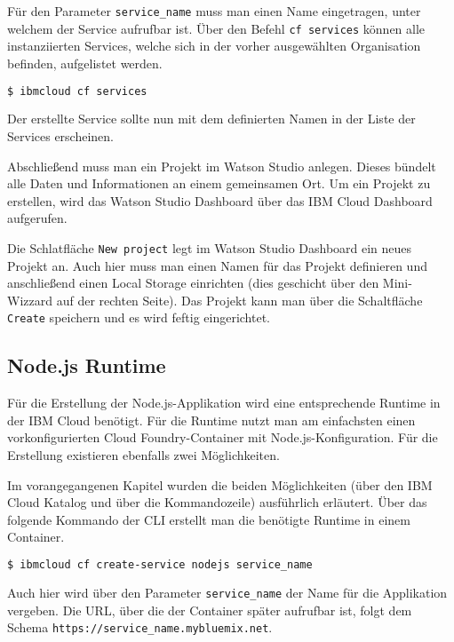 Für den Parameter \texttt{service\_name} muss man einen Name eingetragen, unter welchem der Service aufrufbar ist. Über
den Befehl \texttt{cf services} können alle instanziierten Services, welche sich in der vorher ausgewählten Organisation
befinden, aufgelistet werden.

\begin{lstlisting}[language=bash, caption=Auflisten aller Services in einer Organisation, label=Auflisten aller Services in einer Organisation]
    $ ibmcloud cf services
\end{lstlisting}

Der erstellte Service sollte nun mit dem definierten Namen in der Liste der Services erscheinen.

Abschließend muss man ein Projekt im Watson Studio anlegen. Dieses bündelt alle Daten und Informationen an einem
gemeinsamen Ort. Um ein Projekt zu erstellen, wird das Watson Studio Dashboard über das IBM Cloud Dashboard aufgerufen.

Die Schlatfläche \texttt{New project} legt im Watson Studio Dashboard ein neues Projekt an. Auch hier muss man einen Namen
für das Projekt definieren und anschließend einen Local Storage einrichten (dies geschicht über den Mini-Wizzard auf der
rechten Seite). Das Projekt kann man über die Schaltfläche \texttt{Create} speichern und es wird feftig eingerichtet.

\subsection{Node.js Runtime}
\label{ssc:nodejs_runtime}
Für die Erstellung der Node.js-Applikation wird eine entsprechende Runtime in der IBM Cloud benötigt. Für die Runtime
nutzt man am einfachsten einen vorkonfigurierten Cloud Foundry-Container mit Node.js-Konfiguration. Für die Erstellung
existieren ebenfalls zwei Möglichkeiten.

Im vorangegangenen Kapitel wurden die beiden Möglichkeiten (über den IBM Cloud Katalog und über die Kommandozeile)
ausführlich erläutert. Über das folgende Kommando der CLI erstellt man die benötigte Runtime in einem Container.

\begin{lstlisting}[language=bash, caption=Instanziierung der Node.js Runtime, label=Instanziierung der Node.JS Runtime]
    $ ibmcloud cf create-service nodejs service_name
\end{lstlisting}

Auch hier wird über den Parameter \texttt{service\_name} der Name für die Applikation vergeben. Die URL, über die
der Container später aufrufbar ist, folgt dem Schema \texttt{https://service\_name.mybluemix.net}.

